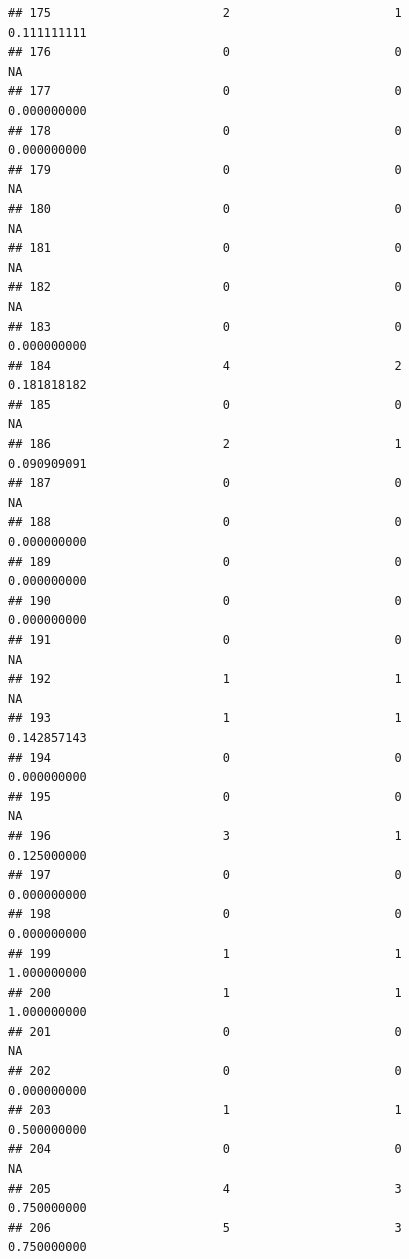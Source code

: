 \documentclass[
]{article}
\begin{document}
\begin{verbatim}
## 175                        2                       1               0.111111111
## 176                        0                       0                        NA
## 177                        0                       0               0.000000000
## 178                        0                       0               0.000000000
## 179                        0                       0                        NA
## 180                        0                       0                        NA
## 181                        0                       0                        NA
## 182                        0                       0                        NA
## 183                        0                       0               0.000000000
## 184                        4                       2               0.181818182
## 185                        0                       0                        NA
## 186                        2                       1               0.090909091
## 187                        0                       0                        NA
## 188                        0                       0               0.000000000
## 189                        0                       0               0.000000000
## 190                        0                       0               0.000000000
## 191                        0                       0                        NA
## 192                        1                       1                        NA
## 193                        1                       1               0.142857143
## 194                        0                       0               0.000000000
## 195                        0                       0                        NA
## 196                        3                       1               0.125000000
## 197                        0                       0               0.000000000
## 198                        0                       0               0.000000000
## 199                        1                       1               1.000000000
## 200                        1                       1               1.000000000
## 201                        0                       0                        NA
## 202                        0                       0               0.000000000
## 203                        1                       1               0.500000000
## 204                        0                       0                        NA
## 205                        4                       3               0.750000000
## 206                        5                       3               0.750000000

\end{verbatim}
\end{document}
